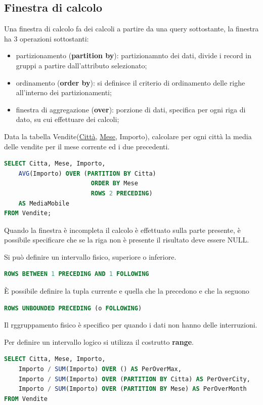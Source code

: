 \documentclass[12pt]{article}
\begin{document}
\subsection{Finestra di calcolo}
Una finestra di calcolo fa dei calcoli a partire da una query sottostante, la finestra ha 3 operazioni sottostanti:
\begin{itemize}
    \item partizionamento (\textbf{partition by}): partizionamnto dei dati, divide i record in gruppi a partire dall'attributo selezionato;
    \item ordinamento (\textbf{order by}): si definisce il criterio di ordinamento delle righe all'interno dei partizionamenti;
    \item finestra di aggregazione (\textbf{over}): porzione di dati, specifica per ogni riga di dato, su cui effettuare dei calcoli;
\end{itemize}
\begin{example}{}{}
    Data la tabella Vendite(\underline{Citt\`a}, \underline{Mese}, Importo), calcolare per ogni citt\`a la media delle vendite per il mese corrente ed i due precedenti.

\begin{lstlisting}[language=sql]
SELECT Citta, Mese, Importo,
    AVG(Importo) OVER (PARTITION BY Citta)
                        ORDER BY Mese
                        ROWS 2 PRECEDING)
    AS MediaMobile
FROM Vendite;
\end{lstlisting}
\end{example}
Quando la finestra \`e incompleta il calcolo \`e effettuato sulla parte presente, \`e possibile specificare che se la riga non \`e presente il risultato deve essere NULL.

Si pu\`o definire un intervallo fisico, superiore o inferiore. 
\begin{lstlisting}[language=sql]
    ROWS BETWEEN 1 PRECEDING AND 1 FOLLOWING
\end{lstlisting}
\`E possibile definire la tupla currente e quella che la precedono e che la seguono
\begin{lstlisting}[language=sql]
ROWS UNBOUNDED PRECEDING (o FOLLOWING)
\end{lstlisting}
Il rggruppamento fisico \`e specifico per quando i dati non hanno delle interruzioni.


Per definire un intervallo logico si utilizza il costrutto \textbf{range}.

\begin{lstlisting}[language=SQL]
SELECT Citta, Mese, Importo,
    Importo / SUM(Importo) OVER () AS PerOverMax,
    Importo / SUM(Importo) OVER (PARTITION BY Citta) AS PerOverCity,
    Importo / SUM(Importo) OVER (PARTITION BY Mese) AS PerOverMonth
FROM Vendite
\end{lstlisting}
\end{document}
